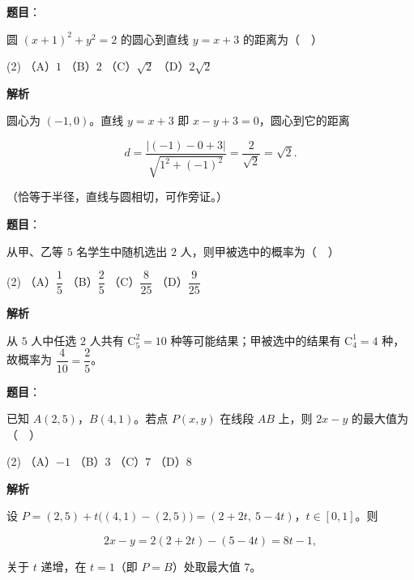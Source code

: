 \begin{answer}

\textbf{题目}：

圆 \((x+1)^{2}+y^{2}=2\) 的圆心到直线 \(y=x+3\) 的距离为（　）

\begin{gkopts}(2)
\task （A）\(1\)
\task （B）\(2\)
\task （C）\(\sqrt{2}\)
\task （D）\(2\sqrt{2}\)
\end{gkopts}

\textbf{解析}

圆心为 \((-1,0)\)。直线 \(y=x+3\) 即 \(x-y+3=0\)，圆心到它的距离

\nopagebreak[4]
\[
d=\frac{|(-1)-0+3|}{\sqrt{1^{2}+(-1)^{2}}}=\frac{2}{\sqrt{2}}=\sqrt{2}.
\]

（恰等于半径，直线与圆相切，可作旁证。）


\end{answer}
\begin{answer}

\textbf{题目}：

从甲、乙等 \(5\) 名学生中随机选出 \(2\) 人，则甲被选中的概率为（　）

\begin{gkopts}(2)
\task （A）\(\dfrac{1}{5}\)
\task （B）\(\dfrac{2}{5}\)
\task （C）\(\dfrac{8}{25}\)
\task （D）\(\dfrac{9}{25}\)
\end{gkopts}

\textbf{解析}

从 \(5\) 人中任选 \(2\) 人共有 \(\mathrm C_5^2=10\) 种等可能结果；甲被选中的结果有 \(\mathrm C_4^1=4\) 种，故概率为 \(\dfrac{4}{10}=\dfrac{2}{5}\)。


\end{answer}
\begin{answer}

\textbf{题目}：

已知 \(A(2,5)\)，\(B(4,1)\)。若点 \(P(x,y)\) 在线段 \(AB\) 上，则 \(2x-y\) 的最大值为（　）

\begin{gkopts}(2)
\task （A）\(-1\)
\task （B）\(3\)
\task （C）\(7\)
\task （D）\(8\)
\end{gkopts}

\textbf{解析}

设 \(P=(2,5)+t\big((4,1)-(2,5)\big)=(2+2t,\ 5-4t)\)，\(t\in[0,1]\)。则

\nopagebreak[4]
\[
2x-y=2(2+2t)-(5-4t)=8t-1,
\]

关于 \(t\) 递增，在 \(t=1\)（即 \(P=B\)）处取最大值 \(7\)。


\end{answer}
